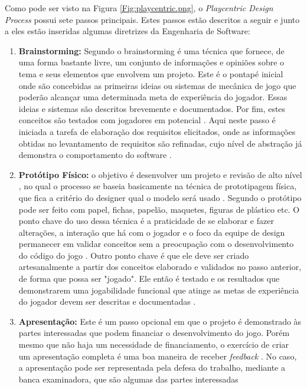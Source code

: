 Como pode ser visto na Figura \ref{Fig:playcentric.png}, o \textit{Playcentric Design Process} possui sete passos principais. Estes passos estão descritos a seguir e junto a eles estão inseridas algumas diretrizes da Engenharia de Software:

\begin{enumerate}
    \item \textbf{Brainstorming:} Segundo \cite[p. 155]{barbosa_silva} o brainstorming é uma técnica que fornece, de uma forma bastante livre, um conjunto de informações e opiniões sobre o tema e seus elementos que envolvem um projeto. %
    Este é o pontapé inicial onde são concebidas as primeiras ideias ou sistemas de mecânica de jogo que poderão alcançar uma determinada meta de experiência do jogador. Essas ideias e sistemas são descritos brevemente e documentados. Por fim, estes conceitos são testados com jogadores em potencial \cite[p. 15]{Fullerton_2008}. %
    Aqui neste passo é iniciada a tarefa de elaboração dos requisitos elicitados, onde as informações obtidas no levantamento de requisitos são refinadas, cujo nível de abstração já demonstra o comportamento do software \cite[p. 128]{Pressman_2000}.
   
    \item \textbf{Protótipo Físico:} o objetivo é desenvolver um projeto e revisão de alto nível \cite{Pressman_2000}, no qual o processo se baseia basicamente na técnica de prototipagem física, que fica a critério do designer qual o modelo será usado \cite{Fullerton_2008}. Segundo  o protótipo pode ser feito com papel, fichas, papelão, maquetes, figuras de plástico etc. O ponto chave do uso dessa técnica é a praticidade de se elaborar e fazer alterações, a interação que há com o jogador e o foco da equipe de design permanecer em validar conceitos sem a preocupação com o desenvolvimento do código do jogo \cite{Fullerton_2008}. 
    Outro ponto chave é que ele deve ser criado artesanalmente a partir dos conceitos elaborado e validados no passo anterior, de forma que possa ser "jogado". Ele então é testado e os resultados que demonstrarem uma jogabilidade funcional que atinge as metas de experiência do jogador devem ser descritas e documentadas \cite{Fullerton_2008}. %

    \item \textbf{Apresentação:} Este é um passo opcional em que o projeto é demonstrado às partes interessadas que podem financiar o desenvolvimento do jogo. Porém mesmo que não haja um necessidade de financiamento, o exercício de criar um apresentação completa é uma boa maneira de receber \textit{feedback} \cite{Fullerton_2008}. No caso, a apresentação pode ser representada pela defesa do trabalho, mediante a banca examinadora, que são algumas das partes interessadas %


\end{enumerate}
